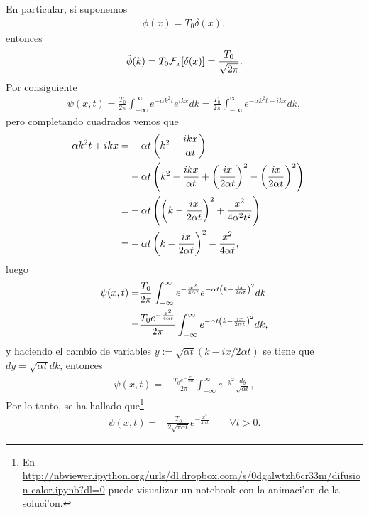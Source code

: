 En particular, si suponemos
\begin{align}
\phi(x)=T_{0}\delta(x),
\end{align}
entonces
\begin{align}
\tilde{\phi}(k)=T_{0}{\cal F}_{x}[\delta(x)]=\frac{T_{0}}{\sqrt{2\pi}}.
\end{align}
Por consiguiente
\begin{align}
\psi(x,t)=\frac{T_{0}}{2\pi}\int_{-\infty}^{\infty}e^{-\alpha k^2 t} e^{ikx}dk
=\frac{T_{0}}{2\pi}\int_{-\infty}^{\infty}e^{-\alpha k^2 t+ikx}dk,
\end{align}
pero completando cuadrados vemos que
\begin{align}
-\alpha k^2 t+ikx=&-\alpha t \left( k^2-\frac{ikx}{\alpha t}\right)\notag \\
=&-\alpha t \left( k^2-\frac{ikx}{\alpha t}+\left(\frac{ix}{2\alpha t}\right)^2-\left(\frac{ix}{2\alpha t}\right)^2\right)\notag \\
=&-\alpha t\left( \left(k-\frac{ix}{2\alpha t} \right)^2 +\frac{x^2}{4 \alpha^2 t^2}\right)\notag \\
=& -\alpha t \left(k-\frac{ix}{2\alpha t} \right)^2-\frac{x^2}{4 \alpha t},
\end{align}
luego
\begin{align}
\psi(x,t)=&\frac{T_{0}}{2\pi}\int _{-\infty}^{\infty}e^{-\frac{x^2}{4 \alpha t}} e^{-\alpha t \left(k-\frac{ix}{2\alpha t} \right)^2} dk\notag \\
=&\frac{T_{0} e^{-\frac{x^2}{4 \alpha t}}}{2\pi}\int _{-\infty}^{\infty}e^{-\alpha t \left(k-\frac{ix}{2\alpha t} \right)^2} dk,
\end{align}
y haciendo el cambio de variables $y:=\sqrt{\alpha t}(k-ix/2\alpha t)$ se tiene que $dy=\sqrt{\alpha t} dk$, entonces
\begin{align}
\psi(x,t)=&\frac{T_{0} e^{-\frac{x^2}{4 \alpha t}}}{2\pi}\int _{-\infty}^{\infty}e^{-y^2} \frac{dy}{\sqrt{\alpha t}},
\end{align}
Por lo tanto, se ha hallado que\footnote{En \url{http://nbviewer.ipython.org/urls/dl.dropbox.com/s/0dgalwtzh6cr33m/difusion-calor.ipynb?dl=0} puede visualizar un notebook con la animaci'on de la soluci'on.}
\begin{align}
\psi(x,t)=&\frac{T_{0}}{2\sqrt{\pi \alpha t}}e^{-\frac{x^2}{4 \alpha t}}\qquad \forall t>0.
\end{align}
